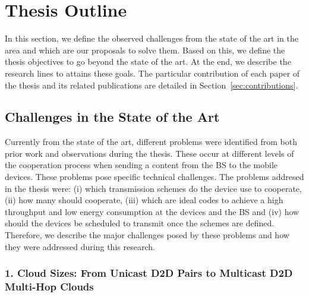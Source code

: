 \section{Thesis Outline}\label{sec:intro_thesis_outline}

In this section, we define the observed challenges from the state of the art in the area and which are our proposals to solve them. Based on this, we define the thesis objectives to go beyond the state of the art. At the end, we describe the research lines to attains these goals. The particular contribution of each paper of the thesis and its related publications are detailed in Section~\ref{sec:contributions}.

\subsection{Challenges in the State of the Art}
Currently from the state of the art, different problems were identified from both prior work and observations during the thesis. These occur at different levels of the cooperation process when sending a content from the \ac{BS} to the mobile devices. These problems pose specific technical challenges. The problems addresed in the thesis were: (i) which transmission schemes do the device use to cooperate, (ii) how many should cooperate, (iii) which are ideal codes to achieve a high throughput and low energy consumption at the devices and the \ac{BS} and (iv) how should the devices be scheduled to transmit once the schemes are defined. Therefore, we describe the major challenges posed by these problems and how they were addressed during this research.

\subsubsection{1. Cloud Sizes: From Unicast D2D Pairs to Multicast D2D Multi-Hop Clouds}
\label{sec:cloud_sizes}

